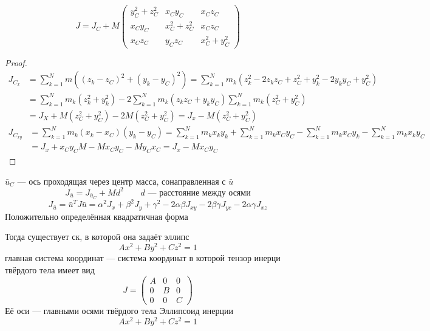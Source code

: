 \documentclass[crop=false]{standalone}
\begin{document}
\begin{theorem}

\end{theorem}
\[J = J_C + M \begin{pmatrix}
    y_C^2 + z_C^2  & x_C y_C & x_C z_C \\ x_C y_C & x_C^2 + z_C^2 & x_C z_C \\ x_C z_C & y_C z_C & x_C^2 + y_C^2
\end{pmatrix}\]
\begin{proof}
    \[
    \begin{aligned}
        J_{C_x} &= \sum_{k=1}^{N} m \left((z_k - z_C)^2 + (y_k - y_C)^2\right) = \sum_{k=1}^{N} m_k (z_k^2 - 2 z_k z_C + z_C^2 + y_k^2 - 2 y_k y_C + y_C^2) \\
        &= \sum_{k=1}^{N} m_k (z_k^2 + y_k^2) - 2\sum_{k=1}^{N} m_k(z_k z_C + y_k y_C) \sum_{k=1}^{N} m_k (z_C^2 + y_C^2) \\
        &= J_X + M (z_C^2 + y_C^2) -2 M (z_C^2 + y_C^2) = J_x - M(z_C^2 + y_C^2)
    \end{aligned}
    \]
    \[
    \begin{aligned}
    J_{C_{x y}} &= \sum_{k=1}^{N} m_k (x_k - x_C) (y_k - y_C) = \sum_{k=1}^{N} m_k x_k y_k + \sum_{k=1}^{N} m_k x_C y_C - \sum_{k=1}^{N} m_k x_C y_k - \sum_{k=1}^{N} m_k x_k y_C \\
    &= J_x + x_C y_C M - M x_C y_C - M y_C x_C = J_x - M x_C y_C
    \end{aligned}
    \]
\end{proof}
$\bar u_C$ — ось проходящая через центр масса, сонаправленная с $\bar u$
\[J_{\bar u} = J_{\bar u_C} + M d^2 \qquad d \text{ — расстояние между осями}\]
\[J_{\bar u} = \bar u ^T J \bar u = \alpha^2 J_x + \beta^2 J_y + \gamma^2 -2 \alpha \beta J_{xy} - 2 \beta \gamma J_{yc} - 2\alpha \gamma J_{xz}\]
\keypoint Положительно определённая квадратичная форма %

Тогда существует ск, в которой она задаёт эллипс
\[A x^2 + B y^2 + C z^2 = 1 \]
\Def главная система координат — система координат в которой тензор инерци твёрдого тела имеет вид 
\[J = \begin{pmatrix}
    A & 0& 0\\0 & B & 0\\ 0&0& C 
\end{pmatrix}\]
Её оси — главными осями твёрдого тела
\Def Эллипсоид инерции
\[A x^2 + B y^2 + C z^2 = 1 \]
\end{document}
